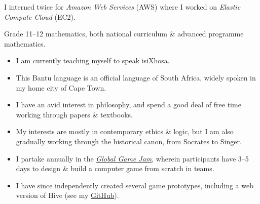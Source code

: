 \documentclass[10pt,a4paper,ragged2e,withhyper]{altacv}
\begin{document}
\begin{paracol}{2}
\divider %

\smallskip
I interned twice for \textit{Amazon Web Services} (AWS) where I worked on \textit{Elastic Compute Cloud} (EC2).

\divider %

\smallskip
Grade 11--12 mathematics, both national curriculum \& advanced programme mathematics.

\medskip

\begin{itemize}
	\item I am currently teaching myself to speak isiXhosa.
	\item This Bantu language is an official language of South Africa, widely spoken in my home city
	of Cape Town.
\end{itemize}
\medskip

\begin{itemize}
	\item I have an avid interest in philosophy, and spend a good deal of free time working through
	papers \& textbooks.
	\item My interests are mostly in contemporary ethics \& logic, but I am also gradually working
	through the historical canon, from Socrates to Singer.
\end{itemize}
\medskip

\begin{itemize}
	\item I partake annually in the
	\href{https://globalgamejam.org/about}{\emph{Global Game Jam}}, wherein participants have 3--5 days to design
	\& build a computer game from scratch in teams.
	\item I have since independently created several game prototypes, including a web version of Hive
	(see my \href{https://github.com/dariotrinchero}{GitHub}).\!\!
\end{itemize}
\medskip


\end{paracol}
\end{document}
